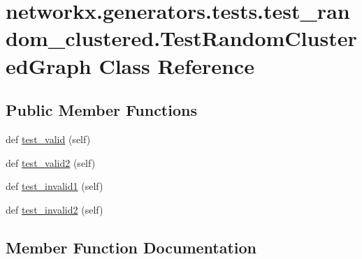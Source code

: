 \hypertarget{classnetworkx_1_1generators_1_1tests_1_1test__random__clustered_1_1TestRandomClusteredGraph}{}\section{networkx.\+generators.\+tests.\+test\+\_\+random\+\_\+clustered.\+Test\+Random\+Clustered\+Graph Class Reference}
\label{classnetworkx_1_1generators_1_1tests_1_1test__random__clustered_1_1TestRandomClusteredGraph}
\subsection*{Public Member Functions}
\begin{DoxyCompactItemize}
\item 
def \hyperlink{classnetworkx_1_1generators_1_1tests_1_1test__random__clustered_1_1TestRandomClusteredGraph_af63d8d3ecd96c47851d11b011972e3b5}{test\+\_\+valid} (self)
\item 
def \hyperlink{classnetworkx_1_1generators_1_1tests_1_1test__random__clustered_1_1TestRandomClusteredGraph_ae1b3098280316efad9a1f78ce54247d4}{test\+\_\+valid2} (self)
\item 
def \hyperlink{classnetworkx_1_1generators_1_1tests_1_1test__random__clustered_1_1TestRandomClusteredGraph_ab720e074676c69a385b1eac6743b8710}{test\+\_\+invalid1} (self)
\item 
def \hyperlink{classnetworkx_1_1generators_1_1tests_1_1test__random__clustered_1_1TestRandomClusteredGraph_ab999027557b11ba3250ec0e9436430fc}{test\+\_\+invalid2} (self)
\end{DoxyCompactItemize}


\subsection{Member Function Documentation}
\mbox{\label{classnetworkx_1_1generators_1_1tests_1_1test__random__clustered_1_1TestRandomClusteredGraph_ab720e074676c69a385b1eac6743b8710}} 

